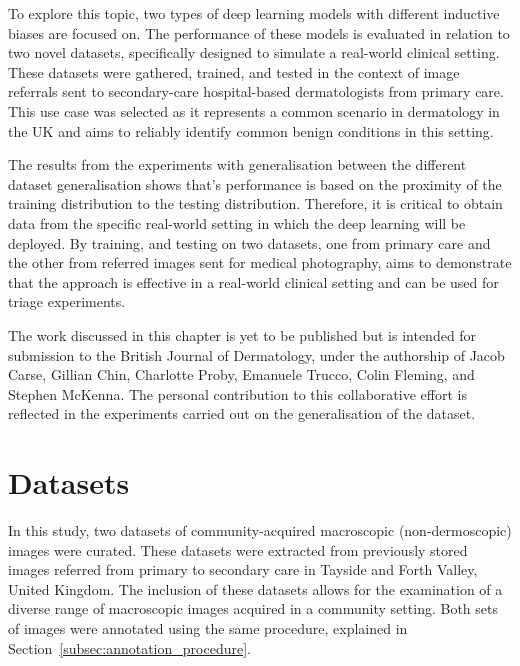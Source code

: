 To explore this topic, two types of deep learning models with different inductive biases are focused on. The performance of these models is evaluated in relation to two novel datasets, specifically designed to simulate a real-world clinical setting. These datasets were gathered, trained, and tested in the context of image referrals sent to secondary-care hospital-based dermatologists from primary care. This use case was selected as it represents a common scenario in dermatology in the UK and aims to reliably identify common benign conditions in this setting.

The results from the experiments with generalisation between the different dataset generalisation shows that’s performance is based on the proximity of the training distribution to the testing distribution. Therefore, it is critical to obtain data from the specific real-world setting in which the deep learning will be deployed. By training, and testing on two datasets, one from primary care and the other from referred images sent for medical photography, aims to demonstrate that the approach is effective in a real-world clinical setting and can be used for triage experiments.

The work discussed in this chapter is yet to be published but is intended for submission to the British Journal of Dermatology, under the authorship of Jacob Carse, Gillian Chin, Charlotte Proby, Emanuele Trucco, Colin Fleming, and Stephen McKenna. The personal contribution to this collaborative effort is reflected in the experiments carried out on the generalisation of the dataset.



\section{Datasets}
\label{sec:generalisation_datasets}
In this study, two datasets of community-acquired macroscopic (non-dermoscopic) images were curated. These datasets were extracted from previously stored images referred from primary to secondary care in Tayside and Forth Valley, United Kingdom. The inclusion of these datasets allows for the examination of a diverse range of macroscopic images acquired in a community setting. Both sets of images were annotated using the same procedure, explained in Section~\ref{subsec:annotation_procedure}.

